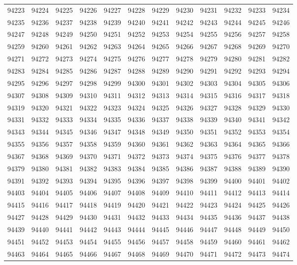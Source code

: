\begin{center}
\begin{longtable}{llllllllllll}
94223 &94224 &94225 &94226 &94227 &94228 &94229 &94230 &94231 &94232 &94233 &94234 \\
94235 &94236 &94237 &94238 &94239 &94240 &94241 &94242 &94243 &94244 &94245 &94246 \\
94247 &94248 &94249 &94250 &94251 &94252 &94253 &94254 &94255 &94256 &94257 &94258 \\
94259 &94260 &94261 &94262 &94263 &94264 &94265 &94266 &94267 &94268 &94269 &94270 \\
94271 &94272 &94273 &94274 &94275 &94276 &94277 &94278 &94279 &94280 &94281 &94282 \\
94283 &94284 &94285 &94286 &94287 &94288 &94289 &94290 &94291 &94292 &94293 &94294 \\
94295 &94296 &94297 &94298 &94299 &94300 &94301 &94302 &94303 &94304 &94305 &94306 \\
94307 &94308 &94309 &94310 &94311 &94312 &94313 &94314 &94315 &94316 &94317 &94318 \\
94319 &94320 &94321 &94322 &94323 &94324 &94325 &94326 &94327 &94328 &94329 &94330 \\
94331 &94332 &94333 &94334 &94335 &94336 &94337 &94338 &94339 &94340 &94341 &94342 \\
94343 &94344 &94345 &94346 &94347 &94348 &94349 &94350 &94351 &94352 &94353 &94354 \\
94355 &94356 &94357 &94358 &94359 &94360 &94361 &94362 &94363 &94364 &94365 &94366 \\
94367 &94368 &94369 &94370 &94371 &94372 &94373 &94374 &94375 &94376 &94377 &94378 \\
94379 &94380 &94381 &94382 &94383 &94384 &94385 &94386 &94387 &94388 &94389 &94390 \\
94391 &94392 &94393 &94394 &94395 &94396 &94397 &94398 &94399 &94400 &94401 &94402 \\
94403 &94404 &94405 &94406 &94407 &94408 &94409 &94410 &94411 &94412 &94413 &94414 \\
94415 &94416 &94417 &94418 &94419 &94420 &94421 &94422 &94423 &94424 &94425 &94426 \\
94427 &94428 &94429 &94430 &94431 &94432 &94433 &94434 &94435 &94436 &94437 &94438 \\
94439 &94440 &94441 &94442 &94443 &94444 &94445 &94446 &94447 &94448 &94449 &94450 \\
94451 &94452 &94453 &94454 &94455 &94456 &94457 &94458 &94459 &94460 &94461 &94462 \\
94463 &94464 &94465 &94466 &94467 &94468 &94469 &94470 &94471 &94472 &94473 &94474 \\

\end{longtable}
\end{center}
